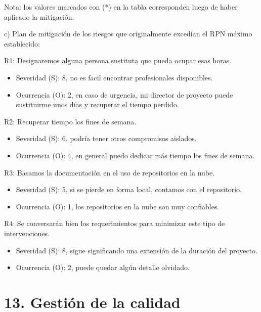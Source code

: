 \documentclass[11pt]{charter}
\begin{document}
Nota: los valores marcados con (*) en la tabla corresponden luego de haber aplicado la mitigación.

c) Plan de mitigación de los riesgos que originalmente excedían el RPN máximo establecido:

R1: Designaremos alguna persona sustituta que pueda ocupar esas horas.
\begin{itemize}
\item Severidad (S): 8, no es facil encontrar profesionales disponibles.
\item Ocurrencia (O): 2, en caso de urgencia, mi director de proyecto puede sustituirme unos días y recuperar el tiempo perdido.
\end{itemize}

R2: Recuperar tiempo los fines de semana.
\begin{itemize}
\item Severidad (S): 6, podría tener otros compromisos aislados.
\item Ocurrencia (O): 4, en general puedo dedicar más tiempo los fines de semana.
\end{itemize}

R3: Basamos la documentación en el uso de repositorios en la nube.
\begin{itemize}
\item Severidad (S): 5, si se pierde en forma local, contamos con el repositorio. 
\item Ocurrencia (O): 1, los repositorios en la nube son muy confiables.
\end{itemize}

R4: Se conversarán bien los requerimientos para minimizar este tipo de intervenciones.
\begin{itemize}
\item Severidad (S): 8, sigue significando una extensión de la duración del proyecto.
\item Ocurrencia (O): 2, puede quedar algún detalle olvidado.
\end{itemize}



\section{13. Gestión de la calidad}
\label{sec:calidad}
\end{document}
